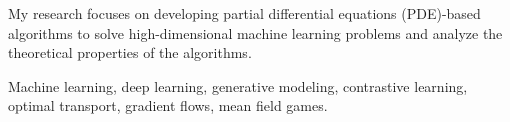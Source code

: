 

\begin{cvparagraph}


My research focuses on developing partial differential equations (PDE)-based algorithms to solve high-dimensional machine learning problems and analyze the theoretical properties of the algorithms.

Machine learning, deep learning, generative modeling, contrastive learning, optimal transport, gradient flows, mean field games.

\end{cvparagraph}